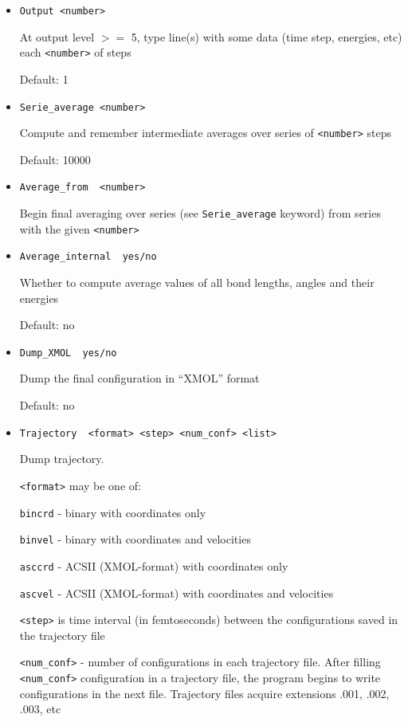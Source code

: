 \documentclass{article}
\begin{document}
\begin{itemize}

\item
\verb|Output <number>|

At output level $>=$ 5, type line(s) with some data (time step, energies, etc)
each \verb|<number>| of steps

Default: 1 

\item
\verb|Serie_average <number>|

Compute and remember intermediate averages over series of \verb|<number>| steps

Default:  10000

\item
\verb|Average_from  <number>|

Begin final averaging over series (see \verb|Serie_average| keyword) from 
series with the given \verb|<number>|

\item
\verb|Average_internal  yes/no|

Whether to compute average values of all bond lengths, angles and their
energies

Default: no


\item
\verb|Dump_XMOL  yes/no|

Dump the final configuration in ``XMOL'' format

Default: no

\item
\verb|Trajectory  <format> <step> <num_conf> <list>|

Dump trajectory. 

\verb|<format>| may be one of:

\verb|bincrd|  - binary with coordinates only

\verb|binvel|  - binary with coordinates and velocities

\verb|asccrd|  - ACSII (XMOL-format) with coordinates only    

\verb|ascvel|  - ACSII (XMOL-format) with coordinates and velocities

\verb|<step>| is time interval (in femtoseconds) between the configurations 
saved in the trajectory file

\verb|<num_conf>| - number of configurations in each trajectory file. 
After filling \verb|<num_conf>| configuration in a trajectory file, 
the program begins to write configurations in the next file. 
Trajectory files acquire extensions .001, .002, .003, etc   


\end{itemize}
\end{document}
